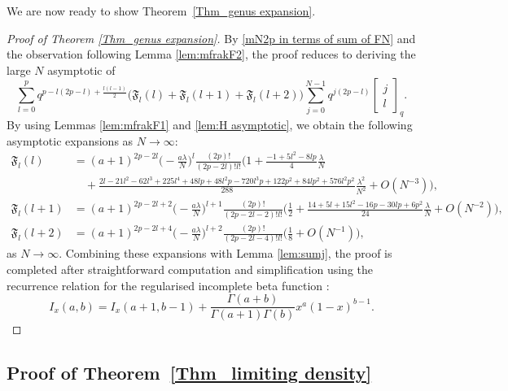 \documentclass{amsart}
\newcommand{\qbinom}[2]{{\begin{bmatrix}#1\\#2\end{bmatrix}}_q}
\theoremstyle{plain}
\theoremstyle{remark}
\numberwithin{equation}{section}
\begin{document}
We are now ready to show Theorem~\ref{Thm_genus expansion}. 

\begin{proof}[Proof of Theorem \ref{Thm_genus expansion}]
   By \eqref{mN2p in terms of sum of FN} and the observation following Lemma \ref{lem:mfrakF2}, the proof reduces to deriving the large $N$ asymptotic of
   \begin{equation*}
       \sum_{l=0}^{p}q^{p-l(2p-l)+\frac{l(l-1)}{2}}\Big(\mathfrak{F}_{l}(l)+\mathfrak{F}_{l}(l+1)+\mathfrak{F}_{l}(l+2) \Big)\sum_{j=0}^{N-1}q^{j(2p-l)}\qbinom{j}{l}.
   \end{equation*}
  By using Lemmas \ref{lem:mfrakF1} and \ref{lem:H asymptotic}, we obtain the following asymptotic expansions as $N \to \infty$: 
   \begin{align*}
       \mathfrak{F}_{l}(l)
       &=(a+1)^{2p-2l}\Big(-\frac{a\lambda}{N}\Big)^{l}\frac{(2p)!}{(2p-2l)!l!}\bigg(1+\frac{-1+5l^2-8lp}{4}\frac{\lambda}{N}\\
       &\quad +\frac{2l-21l^2-62l^3+225l^4+48lp+48l^2p-720l^3p+122p^2+84lp^2+576l^2p^2}{288}\frac{\lambda^2}{N^2}+O(N^{-3})\bigg), 
       \\
       \mathfrak{F}_{l}(l+1)&=(a+1)^{2p-2l+2} \Big(-\frac{a\lambda}{N}\Big)^{l+1}\frac{(2p)!}{(2p-2l-2)!l!} \Big(\frac{1}{2}+\frac{14+5l+15l^2-16p-30lp+6p^2}{24}\frac{\lambda}{N}+O(N^{-2})\Big), 
       \\
       \mathfrak{F}_{l}(l+2)&=(a+1)^{2p-2l+4} \Big(-\frac{a\lambda}{N}\Big)^{l+2}\frac{(2p)!}{(2p-2l-4)!l!}\Big(\frac{1}{8}+O(N^{-1})\Big),
   \end{align*}
   as $N \to \infty$. 
   Combining these expansions with Lemma \ref{lem:sumj}, the proof is completed after straightforward computation and simplification using the recurrence relation for the regularised incomplete beta function \cite[Eq.~(8.18.17)]{NIST}:
   \begin{equation}
       I_x(a,b)=I_x(a+1,b-1)+\frac{\Gamma(a+b)}{\Gamma(a+1)\Gamma(b)} x^a(1-x)^{b-1}.
   \end{equation} 
\end{proof}



\subsection{Proof of Theorem~\ref{Thm_limiting density}}
 
\end{document}
